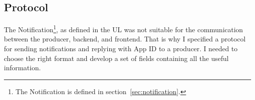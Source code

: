 \subsection{Protocol}\label{sec:protocol}

The Notification\footnote{
  The Notification is defined in section~\ref{sec:notification}.
}, as defined in the \ac{UL}
was not suitable for the communication
between the producer, backend, and frontend.
That is why I specified a protocol
for sending notifications
and replying with App \ac{ID} to a producer.
I needed to choose the right format
and develop a set of fields
containing all the useful information.




